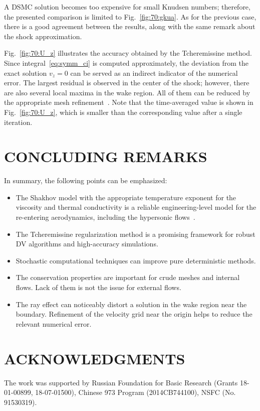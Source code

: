 \documentclass{aip-cp}
\begin{document}
A DSMC solution becomes too expensive for small Knudsen numbers;
therefore, the presented comparison is limited to Fig.~\ref{fig:70:gkua}.
As for the previous case, there is a good agreement between the results,
along with the same remark about the shock approximation.

Fig.~\ref{fig:70:U_z} illustrates the accuracy obtained by the Tcheremissine method.
Since integral~\eqref{eq:symm_ci} is computed approximately,
the deviation from the exact solution \(v_z=0\) can be served as an indirect indicator of the numerical error.
The largest residual is observed in the center of the shock;
however, there are also several local maxima in the wake region.
All of them can be reduced by the appropriate mesh refinement~\cite{Kolobov2013}.
Note that the time-averaged value is shown in Fig.~\ref{fig:70:U_z},
which is smaller than the corresponding value after a single iteration.

\section{CONCLUDING REMARKS}

In summary, the following points can be emphasized:
\begin{itemize}
    \item The Shakhov model with the appropriate temperature exponent for the viscosity and thermal conductivity
    is a reliable engineering-level model for the re-entering aerodynamics,
    including the hypersonic flows~\cite{Titarev2018, Frolova2018}.
    \item The Tcheremissine regularization method is a promising framework for robust DV algorithms and high-accuracy simulations.
    \item Stochastic computational techniques can improve pure deterministic methods.
    \item The conservation properties are important for crude meshes and internal flows.
    Lack of them is not the issue for external flows.
    \item The ray effect can noticeably distort a solution in the wake region near the boundary.
    Refinement of the velocity grid near the origin helps to reduce the relevant numerical error.
\end{itemize}

\section{ACKNOWLEDGMENTS}
The work was supported by Russian Foundation for Basic Research (Grants 18-01-00899, 18-07-01500),
Chinese 973 Program (2014CB744100), NSFC (No. 91530319).


%
%
\end{document}

